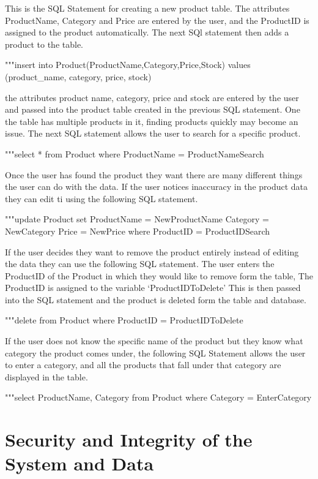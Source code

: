 This is the SQL Statement for creating a new product table. The attributes ProductName, Category and Price are entered by the user, and the ProductID is assigned to the product automatically. The next SQl statement then adds a product to the table.
\begin{python}
"""insert into
Product(ProductName,Category,Price,Stock) values (product_name, category, price, stock)
\end{python}

the attributes product name, category, price and stock are entered by the user and passed into the product table created in the previous SQL statement. One the table has multiple products in it, finding products quickly may become an issue. The next SQL statement allows the user to search for a specific product.
\begin{python}
        	"""select *
        	 from Product
        	 where ProductName = ProductNameSearch
\end{python}

Once the user has found the product they want there are many different things the user can do with the data. If the user notices inaccuracy in the product data they can edit ti using the following SQL statement.
\begin{python}
	"""update Product set
	ProductName = NewProductName
	 Category = NewCategory
 	Price = NewPrice
 	where ProductID = ProductIDSearch
\end{python}
If the user decides they want to remove the product entirely instead of editing the data they can use the following SQL statement. The user enters the ProductID of the Product in which they would like to remove form the table, The ProductID is assigned to the variable `ProductIDToDelete' This is then passed into the SQL statement and the product is deleted form the table and database.
\begin{python}
	"""delete from Product
 where ProductID = ProductIDToDelete
\end{python}
If the user does not know the specific name of the product but they know what category the product comes under, the following SQL Statement allows the user to enter a category, and all the products that fall under that category are displayed in the table.
\begin{python}
	"""select ProductName, Category
	from Product
	where Category = EnterCategory
\end{python}

\section{Security and Integrity of the System and Data}

